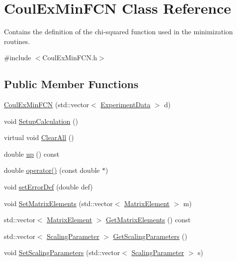\hypertarget{classCoulExMinFCN}{\section{Coul\-Ex\-Min\-F\-C\-N Class Reference}
\label{classCoulExMinFCN}
}


Contains the definition of the chi-\/squared function used in the minimization routines.  




{\ttfamily \#include $<$Coul\-Ex\-Min\-F\-C\-N.\-h$>$}

\subsection*{Public Member Functions}
\begin{DoxyCompactItemize}
\item 
\hyperlink{classCoulExMinFCN_adbe1821d52bea6bdc1ec188958fe3e72}{Coul\-Ex\-Min\-F\-C\-N} (std\-::vector$<$ \hyperlink{classExperimentData}{Experiment\-Data} $>$ d)
\item 
void \hyperlink{classCoulExMinFCN_a89b319adcf1dcc2d24f402b4dd7c340a}{Setup\-Calculation} ()
\item 
virtual void \hyperlink{classCoulExMinFCN_a5d8e5649a07ab34af3dfe6919ae23a45}{Clear\-All} ()
\item 
double \hyperlink{classCoulExMinFCN_aa55363166ec08dde3977a6f68fe9c000}{up} () const 
\item 
double \hyperlink{classCoulExMinFCN_a86c9ca39401046b83ec30d1d9e1fd013}{operator()} (const double $\ast$)
\item 
void \hyperlink{classCoulExMinFCN_a31d1efece8245aa8c5f7d826be724afe}{set\-Error\-Def} (double def)
\item 
void \hyperlink{classCoulExMinFCN_ac50ca91030a19d63c9476eee772b6a65}{Set\-Matrix\-Elements} (std\-::vector$<$ \hyperlink{classMatrixElement}{Matrix\-Element} $>$ m)
\item 
std\-::vector$<$ \hyperlink{classMatrixElement}{Matrix\-Element} $>$ \hyperlink{classCoulExMinFCN_aabad065c936dcadcdb5b6feeec1b2513}{Get\-Matrix\-Elements} () const 
\item 
std\-::vector$<$ \hyperlink{classScalingParameter}{Scaling\-Parameter} $>$ \hyperlink{classCoulExMinFCN_a98793547bdd277351be2650415b0f19a}{Get\-Scaling\-Parameters} ()
\item 
void \hyperlink{classCoulExMinFCN_a0085795bcbab406044b01571a92ef512}{Set\-Scaling\-Parameters} (std\-::vector$<$ \hyperlink{classScalingParameter}{Scaling\-Parameter} $>$ s)

\end{DoxyCompactItemize}
